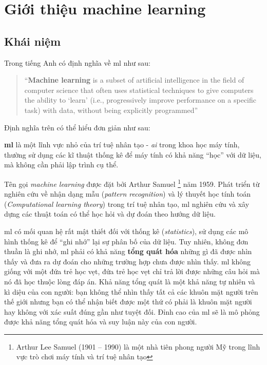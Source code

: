 \documentclass[../main-report.tex]{subfiles}
\begin{document}
\section{Giới thiệu machine learning}
\subsection{Khái niệm}
Trong tiếng Anh có định nghĩa về \gls{ml} như sau:

\begin{quote}
``\textbf{Machine learning} is a subset of artificial intelligence in the field of computer science that often uses statistical techniques to give computers the ability to `learn' (i.e., progressively improve performance on a specific task) with data, without being explicitly programmed'' \citep{samuel1959some}
\end{quote}

Định nghĩa trên có thể hiểu đơn giản như sau: 

\textbf{\Gls{ml}} là một lĩnh vực nhỏ của trí tuệ nhân tạo - \emph{\acrfull{ai}} trong khoa học máy tính, thường sử dụng các kĩ thuật thống kê để máy tính có khả năng ``học'' với dữ liệu, mà không cần phải lập trình cụ thể.

Tên gọi \emph{machine learning} được đặt bởi Arthur Samuel \footnote{Arthur Lee Samuel (1901 – 1990) là một nhà tiên phong người Mỹ trong lĩnh vực trò chơi máy tính và trí tuệ nhân tạo} năm 1959. Phát triển từ nghiên cứu về nhận dạng mẫu (\emph{pattern recognition}) và lý thuyết học tính toán (\emph{Computational learning theory}) trong trí tuệ nhân tạo, \gls{ml} nghiên cứu và xây dựng các thuật toán có thể học hỏi và dự đoán theo hướng dữ liệu.

\Gls{ml} có mối quan hệ rất mật thiết đối với thống kê (\textit{statistics}), sử dụng các mô hình thống kê để ``ghi nhớ'' lại sự phân bố của dữ liệu. Tuy nhiên, không đơn thuần là ghi nhớ, \gls{ml} phải có khả năng \textbf{tổng quát hóa} những gì đã được nhìn thấy và đưa ra dự đoán cho những trường hợp chưa được nhìn thấy. \Gls{ml} không giống với một đứa trẻ học vẹt, đứa trẻ học vẹt chỉ trả lời được những câu hỏi mà nó đã học thuộc lòng đáp án. Khả năng tổng quát là một khả năng tự nhiên và kì diệu của con người: bạn không thể nhìn thấy tất cả các khuôn mặt người trên thế giới nhưng bạn có thể nhận biết được một thứ có phải là khuôn mặt người hay không với xác suất đúng gần như tuyệt đối. Đỉnh cao của \gls{ml} sẽ là mô phỏng được khả năng tổng quát hóa và suy luận này của con người.
\end{document}
